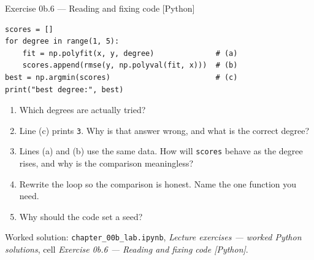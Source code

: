 \documentclass[aspectratio=169,11pt]{beamer}
\begin{document}
\begin{frame}[fragile]{Exercise 0b.6 --- Reading and fixing code [Python]}
  \begin{exercise}
    \scriptsize
\begin{lstlisting}[basicstyle=\ttfamily\scriptsize,aboveskip=2pt,belowskip=1pt]
scores = []
for degree in range(1, 5):
    fit = np.polyfit(x, y, degree)              # (a)
    scores.append(rmse(y, np.polyval(fit, x)))  # (b)
best = np.argmin(scores)                        # (c)
print("best degree:", best)
\end{lstlisting}
    \begin{enumerate}\setlength{\itemsep}{0pt}
      \item Which degrees are actually tried?
      \item Line (c) prints \texttt{3}. Why is that answer wrong, and what is
            the correct degree?
      \item Lines (a) and (b) use the same data. How will \texttt{scores}
            behave as the degree rises, and why is the comparison meaningless?
      \item Rewrite the loop so the comparison is honest. Name the one
            function you need.
      \item Why should the code set a seed?
    \end{enumerate}
  \end{exercise}
  \vspace{-10pt}
  \begin{labnote}
    Worked solution: \texttt{chapter\_00b\_lab.ipynb}, \emph{Lecture exercises
    --- worked Python solutions}, cell \emph{Exercise 0b.6 --- Reading and fixing code [Python]}.
  \end{labnote}
\end{frame}
\end{document}
